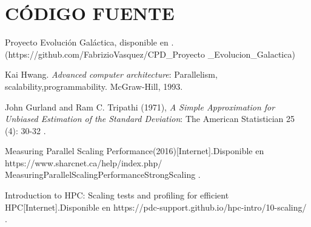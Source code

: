 \documentclass[conference]{IEEEtran}
\begin{document}
\section{CÓDIGO FUENTE}
Proyecto Evolución Galáctica, disponible en \href{https://github.com/FabrizioVasquez/CPD_Proyecto_Evolucion_Galactica}{}. 
(https://github.com/FabrizioVasquez/CPD\_Proyecto
\_Evolucion\_Galactica)



\begin{thebibliography}{1}
Kai Hwang. \emph{Advanced computer architecture}: Parallelism, scalability,programmability. McGraw-Hill, 1993.

John Gurland and Ram C. Tripathi (1971), \emph{A Simple Approximation for Unbiased Estimation of the Standard Deviation}: The American Statistician 25 (4): 30-32 .

Measuring Parallel Scaling Performance(2016)[Internet].Disponible en https://www.sharcnet.ca/help/index.php/\\MeasuringParallelScalingPerformanceStrongScaling .

Introduction to HPC: Scaling tests and profiling for efficient HPC[Internet].Disponible en https://pdc-support.github.io/hpc-intro/10-scaling/ .

\end{thebibliography}
\end{document}
